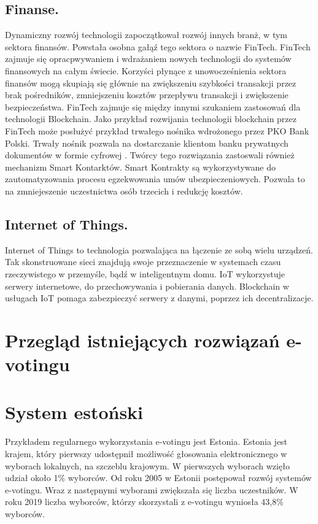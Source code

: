 \documentclass[a4paper,13pt]{report}
\begin{document}
\subsection{Finanse.}

Dynamiczny rozwój technologii zapoczątkował rozwój innych branż, w tym sektora finansów. Powstała osobna gałąź tego sektora o nazwie FinTech. FinTech zajmuje się opracpwywaniem i wdrażaniem nowych technologii do systemów finansowych na całym świecie. Korzyści płynące z unowocześnienia sektora finansów mogą skupiają się głównie na zwiększeniu szybkości transakcji przez brak pośredników, zmniejszeniu kosztów przepływu transakcji i zwiększenie bezpieczeństwa. FinTech zajmuje się między innymi szukaniem zastosowań dla technologii Blockchain. Jako przykład rozwijania technologii blockchain przez FinTech może posłużyć przykład trwałego nośnika wdrożonego przez PKO Bank Polski. Trwały nośnik pozwala na dostarczanie klientom banku prywatnych dokumentów w formie cyfrowej \cite{PKO}. Twórcy tego rozwiązania zastoswali również mechanizm Smart Kontarktów. Smart Kontrakty są wykorzystywane do zautomatyzowania procesu egzekwowania umów ubezpieczeniowych\cite{PKO-SMART}. Pozwala to na zmniejeszenie uczestnictwa osób trzecich i redukcję kosztów.

\subsection{Internet of Things.}

Internet of Things to technologia pozwalająca na łączenie ze sobą wielu urządzeń. Tak skonstruowane sieci znajdują swoje przeznaczenie w systemach czasu rzeczywistego w przemyśle, bądź w inteligentnym domu. IoT wykorzystuje serwery internetowe, do przechowywania i pobierania danych. Blockchain w usługach IoT pomaga zabezpieczyć serwery z danymi, poprzez ich decentralizacje.

\newpage

\section{Przegląd istniejących rozwiązań e-votingu}
\section{System estoński}
Przykładem regularnego wykorzystania e-votingu jest Estonia. Estonia jest krajem, który pierwszy udostępnił możliwość głosowania elektronicznego w wyborach lokalnych, na szczeblu krajowym. W pierwszych wyborach wzięło udział około 1\% wyborców. Od roku 2005 w Estonii postępował rozwój systemów e-votingu. Wraz z następnymi wyborami zwiększała się liczba uczestników. W roku 2019 liczba wyborców, którzy skorzystali z e-votingu wyniosła 43,8\% wyborców.
\end{document}
